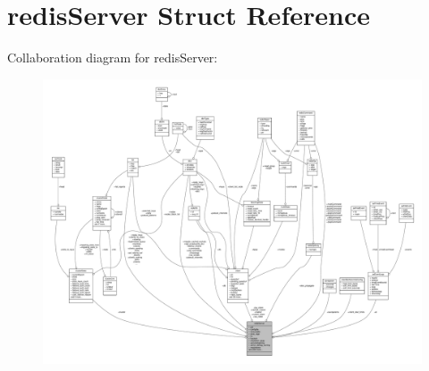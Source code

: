 \hypertarget{structredisServer}{}\section{redis\+Server Struct Reference}
\label{structredisServer}


Collaboration diagram for redis\+Server\+:\nopagebreak
\begin{figure}[H]
\begin{center}
\leavevmode
\includegraphics[width=350pt]{structredisServer__coll__graph}
\end{center}
\end{figure}
